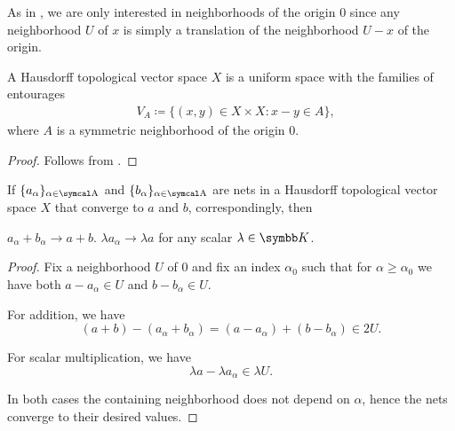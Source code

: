 \begin{remark}\label{remark:origin_neighborhoods_in_topological_vector_spaces}
  As in , we are only interested in neighborhoods of the origin \( 0 \) since any neighborhood \( U \) of \( x \) is simply a translation of the neighborhood \( U - x \) of the origin.
\end{remark}

\begin{proposition}\label{thm:topological_vector_space_is_uniform}
  A Hausdorff topological vector space \( X \) is a uniform space with the families of entourages
  \begin{align*}
    &V_A \coloneqq \{ (x, y) \in X \times X \colon x - y \in A \},
  \end{align*}
  where \( A \) is a symmetric neighborhood of the origin \( 0 \).
\end{proposition}
\begin{proof}
  Follows from .
\end{proof}

\begin{proposition}\label{thm:linearity_of_sequence_limits}
  If \( \{ a_\alpha \}_{\alpha \in \CA} \) and \( \{ b_\alpha \}_{\alpha \in \CA} \) are nets in a Hausdorff topological vector space \( X \) that converge to \( a \) and \( b \), correspondingly, then
  \begin{propenum}
     \( a_\alpha + b_\alpha \to a + b \).
     \( \lambda a_\alpha \to \lambda a \) for any scalar \( \lambda \in \BK \).
  \end{propenum}
\end{proposition}
\begin{proof}
  Fix a neighborhood \( U \) of \( 0 \) and fix an index \( \alpha_0 \) such that for \( \alpha \geq \alpha_0 \) we have both \( a - a_\alpha \in U \) and \( b - b_\alpha \in U \).

  \begin{description}
     For addition, we have
    \begin{equation*}
      (a + b) - (a_\alpha + b_\alpha) = (a - a_\alpha) + (b - b_\alpha) \in 2U.
    \end{equation*}

     For scalar multiplication, we have
    \begin{equation*}
      \lambda a - \lambda a_\alpha \in \lambda U.
    \end{equation*}
  \end{description}

  In both cases the containing neighborhood does not depend on \( \alpha \), hence the nets converge to their desired values.
\end{proof}

